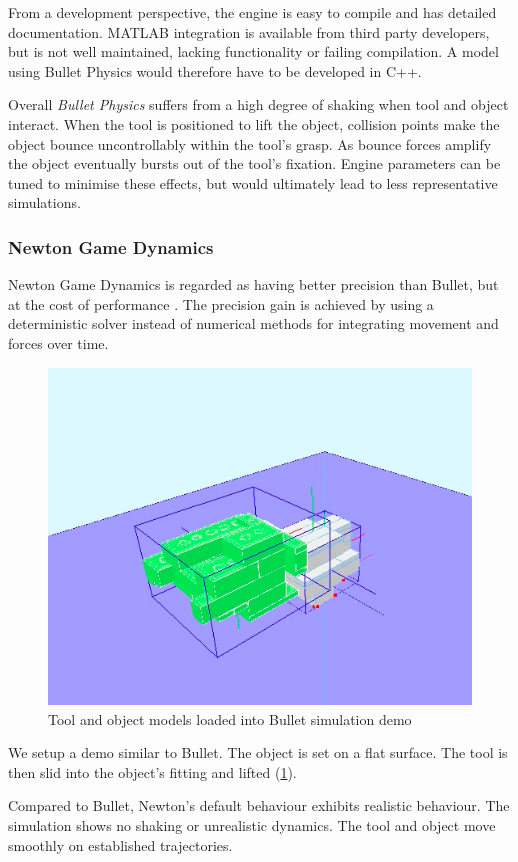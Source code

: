 \documentclass[11]{article}
\begin{document}
From a development perspective, the engine is easy to compile and has detailed documentation.
MATLAB integration is available from third party developers, but is not well maintained, lacking functionality or failing compilation.
A model using Bullet Physics would therefore have to be developed in C++. 

Overall \emph{Bullet Physics} suffers from a high degree of shaking when tool and object interact. 
When the tool is positioned to lift the object, collision points make the object bounce uncontrollably within the tool's grasp. 
As bounce forces amplify the object eventually bursts out of the tool's fixation.  
Engine parameters can be tuned to minimise these effects, but would ultimately lead to less representative simulations. 

\subsubsection{Newton Game Dynamics}
Newton Game Dynamics is regarded as having better precision than Bullet, but at the cost of performance \cite{hummel2012}. 
The precision gain is achieved by using a deterministic solver instead of numerical methods for integrating movement and forces over time. 

\begin{figure}[h]
  \centering
  \includegraphics[width=.5\textwidth]{figures/newton_demo.png}
  \caption{Tool and object models loaded into Bullet simulation demo}
  \label{fig:newton_demo}
\end{figure}      

We setup a demo similar to Bullet.
The object is set on a flat surface. 
The tool is then slid into the object's fitting and lifted (\ref{fig:newton_demo}). 

Compared to Bullet, Newton's default behaviour exhibits realistic behaviour. 
The simulation shows no shaking or unrealistic dynamics.
The tool and object move smoothly on established trajectories. 
\end{document}
